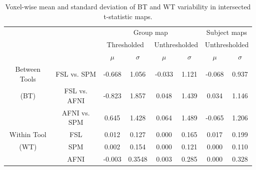 \setlength{\tabcolsep}{5pt}
\begin{table}[h]
  \centering
  \begin{tabular}{cccccc|cc}
    \toprule
                      &              & \multicolumn{4}{c|}{Group map}  & \multicolumn{2}{c}{Subject maps}                                                                     \\
    \multirow{2}{*}{} & {}           & \multicolumn{2}{c}{Thresholded} & \multicolumn{2}{c|}{Unthresholded} & \multicolumn{2}{c}{Unthresholded}                               \\
    {}                & {}           & $\mu$                           & $\sigma$                           & $\mu$                             & $\sigma$ & $\mu$ & $\sigma$ \\
    \midrule
    \rowcolor{lightgray!50}
    {Between Tools}   & FSL vs. SPM  & -0.668                           & 1.056                              & -0.033                             & 1.121    & -0.068 & 0.937    \\
    \rowcolor{lightgray!50}
    {(BT)}            & FSL vs. AFNI & -0.823                           & 1.857                              & 0.048                             & 1.439    & 0.034 & 1.146    \\
    \rowcolor{lightgray!50}
    {}                & AFNI vs. SPM & 0.645                           & 1.428                              & 0.064                             & 1.489    & -0.065 & 1.206    \\
    {Within Tool}     & FSL          & 0.012                           & 0.127                              & 0.000                             & 0.165    & 0.017 & 0.199    \\
    {(WT)}            & SPM          & 0.002                           & 0.154                              & 0.000                             & 0.121    & 0.000 & 0.110    \\
    {}                & AFNI         & -0.003                           & 0.3548                              & 0.003                             & 0.285    & 0.000 & 0.328    \\
    \bottomrule
  \end{tabular}
  \caption{Voxel-wise mean and standard deviation of BT and WT variability in intersected t-statistic maps.}
  \label{table:pipeline-stats-fixed-mask}
\end{table}

